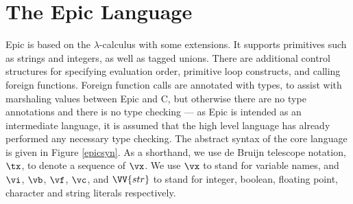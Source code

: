 \section{The Epic Language}

Epic is based on the $\lambda$-calculus with some extensions.
It supports primitives such as strings and integers, as well as tagged
unions. There are additional control structures for specifying
evaluation order, primitive loop constructs, and calling foreign
functions. Foreign function calls are annotated with types, to assist
with marshaling values between Epic and C, but otherwise there are no
type annotations and there is no type checking --- as Epic is intended
as an intermediate language, it is assumed that the high level
language has already performed any necessary type checking. The
abstract syntax of the core language is given in Figure \ref{epicsyn}.
As a shorthand, we use de Bruijn telescope notation, $\tx$, to denote
a sequence of $\vx$.
We use $\vx$ to stand for variable names, and $\vi$, $\vb$, $\vf$,
$\vc$, and $\VV{str}$ to stand for integer, boolean, floating
point, character and string literals respectively.

\newcommand{\Con}[2]{\DC{Con}\:#1(#2)}

